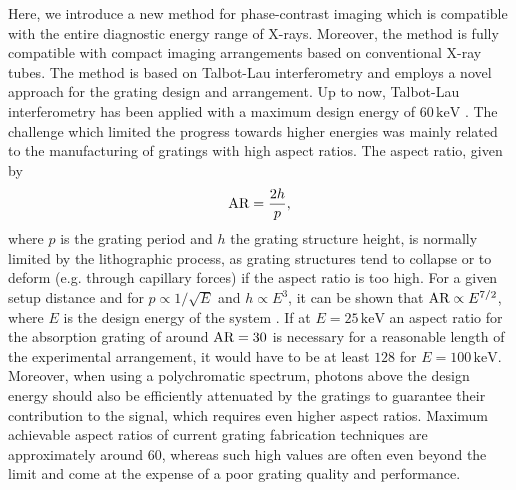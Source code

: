 \documentclass[aip,apl,amsmath,amssymb,floatfix,reprint,a4paper]{revtex4-1}
\newcommand{\unit}[1]{\ensuremath{\, \mathrm{#1}}}
\begin{document}
Here, we introduce a new method for phase-contrast imaging which is compatible with the entire diagnostic energy range of X-rays. Moreover, the method is fully compatible with compact imaging arrangements based on conventional X-ray tubes. The method is based on Talbot-Lau interferometry \cite{Pfeiffer2006} and employs a novel approach for the grating design and arrangement. Up to now, Talbot-Lau interferometry has been applied with a maximum design energy of $60 \unit{keV}$ \cite{Donath2009}. The challenge which limited the progress towards higher energies was mainly related to the manufacturing of gratings with high aspect ratios. The aspect ratio, given by
\begin{equation}
 \textnormal{AR} = \frac{2h}{p},
\end{equation}
where $p$ is the grating period and $h$ the grating structure height, is normally limited by the lithographic process, as grating structures tend to collapse or to deform (e.g. through capillary forces) if the aspect ratio is too high. For a given setup distance and for $p \propto 1/\sqrt{E}$ and $h \propto E^3$, it can be shown that $\textnormal{AR} \propto E^{7/2}$, where $E$ is the design energy of the system \cite{Momose2003a}. If at $E=25 \unit{keV}$ an aspect ratio for the absorption grating of around $\textnormal{AR}=30$ is necessary for a reasonable length of the experimental arrangement, it would have to be at least $128$ for $E=100 \unit{keV}$. Moreover, when using a polychromatic spectrum, photons above the design energy should also be efficiently attenuated by the gratings to guarantee their contribution to the signal, which requires even higher aspect ratios. Maximum achievable aspect ratios of current grating fabrication techniques \cite{David2007,Kenntner2010} are approximately around 60, whereas such high values are often even beyond the limit and come at the expense of a poor grating quality and performance.
\end{document}
